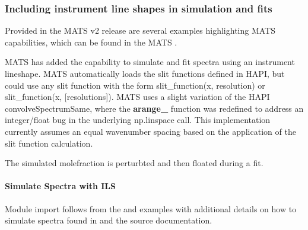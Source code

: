 \documentclass[letterpaper,10pt,english]{sphinxmanual}
\begin{document}
\sphinxstepscope


\subsubsection{Including instrument line shapes in simulation and fits}
\label{\detokenize{Including instrument line shapes in simulation and fits:including-instrument-line-shapes-in-simulation-and-fits}}\label{\detokenize{Including instrument line shapes in simulation and fits::doc}}
\sphinxAtStartPar
Provided in the MATS v2 release are several examples highlighting MATS capabilities, which can be found in the MATS .

\sphinxAtStartPar
MATS has added the capability to simulate and fit spectra using an instrument lineshape.  MATS automatically loads the slit functions defined in HAPI, but could use any slit function with the form slit\_function(x, resolution) or slit\_function(x, {[}resolutions{]}).  MATS uses a slight variation of the HAPI convolveSpectrumSame, where the {\color{red}\bfseries{}arange\_} function was redefined to address an integer/float bug in the underlying np.linspace call.  This implementation currently assumes an equal wavenumber spacing based on the application of the slit function calculation.

\sphinxAtStartPar
{}   The simulated molefraction is perturbted and then floated during a fit.


\paragraph{Simulate Spectra with ILS}
\label{\detokenize{Including instrument line shapes in simulation and fits:simulate-spectra-with-ils}}
\sphinxAtStartPar
Module import follows from the {\hyperref[\detokenize{Fitting Experimental Spectra:fitting-experimental-spectra}]{}} and {\hyperref[\detokenize{Fitting Synthetic Spectra:fitting-synthetic-spectra}]{}} examples with additional details on how to simulate spectra found in {\hyperref[\detokenize{Fitting Synthetic Spectra:fitting-synthetic-spectra}]{}} and the source documentation.
\end{document}
